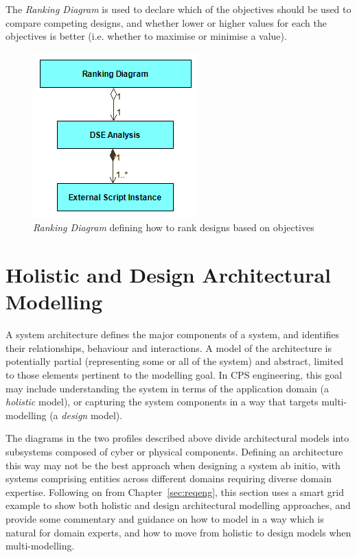 The \emph{Ranking Diagram} is used to declare which of the objectives should be used to compare competing designs, and whether lower or higher values for each the objectives is better (i.e. whether to maximise or minimise a value).

\begin{figure}[h!]
\centering
\includegraphics[scale=0.5]{figures/DSE/RankingView}
\caption{\emph{Ranking Diagram} defining how to rank designs based on objectives}
\label{fig:sysml:sysml:dse:rd}
\end{figure}


\section{Holistic and Design Architectural Modelling}
\label{sec:sysml:holistic}

A system architecture defines the major components of a system, and identifies their relationships, behaviour and interactions. A model of the architecture is potentially partial (representing some or all of the system) and abstract, limited to those elements pertinent to the modelling goal. In CPS engineering, this goal may include understanding the system in terms of the application domain (a \emph{holistic} model), or capturing the system components in a way that targets multi-modelling (a \emph{design} model).

The diagrams in the two profiles described above divide architectural models into subsystems composed of cyber or physical components. Defining an architecture this way may not be the best approach when designing a system ab initio, with systems comprising entities across different domains requiring diverse domain expertise. Following on from Chapter~\ref{sec:reqeng}, this section uses a smart grid example to show both holistic and design architectural modelling approaches, and provide some commentary and guidance on how to model in a way which is natural for domain experts, and how to move from holistic to design models when multi-modelling.


